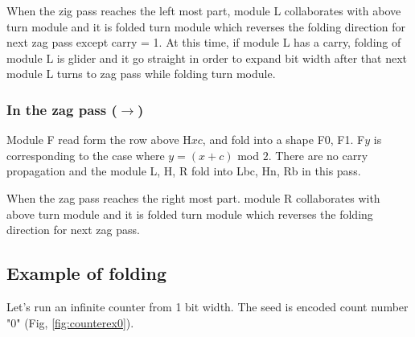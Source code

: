 \documentclass[runningheads]{llncs}
\begin{document}
When the zig pass reaches the left most part, module L collaborates with above turn module and it is folded turn module which reverses the folding direction for next zag pass except carry = 1.
At this time, if module L has a carry, folding of module L is glider and it go straight in order to expand bit width after that next module L turns to zag pass while folding turn module.

\subsubsection{In the zag pass ($\rightarrow$)}
Module F read form the row above H$xc$, and fold into a shape F0, F1.
F$y$ is corresponding to the case where $y = (x + c)$ mod $2$.
There are no carry propagation and the module L, H, R fold into Lbc, Hn, Rb in this pass.

When the zag pass reaches the right most part. module R collaborates with above turn module and it is folded turn module which reverses the folding direction for next zag pass.

\subsection{Example of folding}
Let's run an infinite counter from 1 bit width.
The seed is encoded count number "0" (Fig, \ref{fig:counterex0}).
\end{document}

